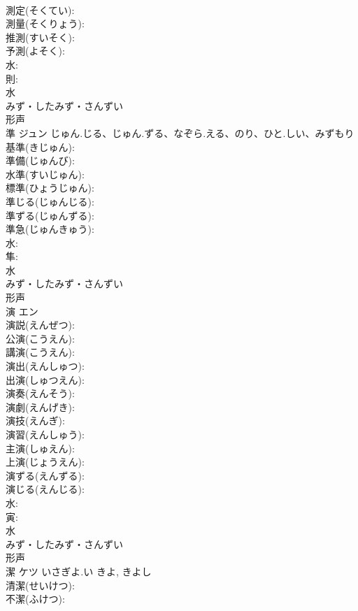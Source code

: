 \documentclass[8pt]{extreport}
\begin{document}
\begin{CJK}{UTF8}{min}
\\	測定(そくてい): 
\\	測量(そくりょう): 
\\	推測(すいそく): 
\\	予測(よそく): 
\\	水: 
\\	則: 
\\	水	
\\	みず・したみず・さんずい	
\\	形声 
\\	準	ジュン	じゅん.じる、じゅん.ずる、なぞら.える、のり、ひと.しい、みずもり		
\\	基準(きじゅん): 
\\	準備(じゅんび): 
\\	水準(すいじゅん): 
\\	標準(ひょうじゅん): 
\\	準じる(じゅんじる): 
\\	準ずる(じゅんずる): 
\\	準急(じゅんきゅう): 
\\	水: 
\\	隼: 
\\	水	
\\	みず・したみず・さんずい	
\\	形声 
\\	演	エン			
\\	演説(えんぜつ): 
\\	公演(こうえん): 
\\	講演(こうえん): 
\\	演出(えんしゅつ): 
\\	出演(しゅつえん): 
\\	演奏(えんそう): 
\\	演劇(えんげき): 
\\	演技(えんぎ): 
\\	演習(えんしゅう): 
\\	主演(しゅえん): 
\\	上演(じょうえん): 
\\	演ずる(えんずる): 
\\	演じる(えんじる): 
\\	水: 
\\	寅: 
\\	水	
\\	みず・したみず・さんずい	
\\	形声 
\\	潔	ケツ	いさぎよ.い	きよ, きよし	
\\	清潔(せいけつ): 
\\	不潔(ふけつ): 

\end{CJK}
\end{document}
